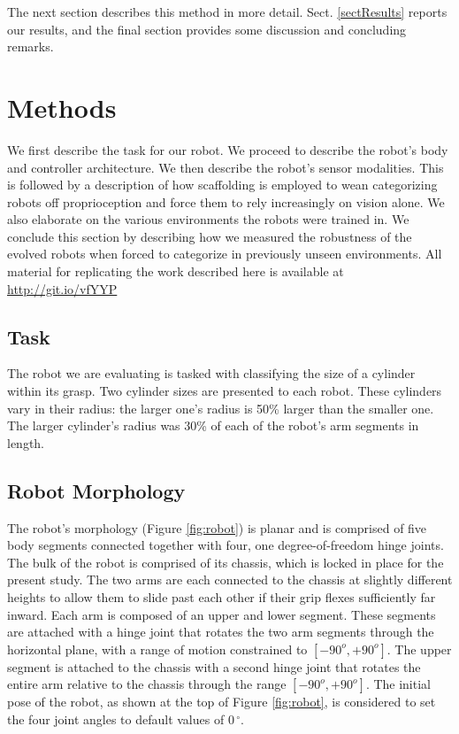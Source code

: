 \documentclass{sig-alternate}
\begin{document}
The next section describes this method in more detail. Sect. \ref{sectResults}
reports our results, and the final section provides some discussion
and concluding remarks.

\section {Methods}
\label{sectMethods}

We first describe the task for our robot. We proceed to describe the robot's body and
controller architecture. We then describe the robot's sensor modalities. This is
followed by a description of how scaffolding is employed to wean categorizing robots
off proprioception and force them to rely increasingly on vision alone. We also elaborate on the various environments the robots were trained in. We conclude
this section by describing how we measured the robustness of the evolved robots when
forced to categorize in previously unseen environments.
All material for replicating the work described here is available at
\href{http://git.io/vfYYP}{http://git.io/vfYYP}

\subsection {Task}

The robot we are evaluating is tasked with classifying the size of a cylinder within its grasp. Two cylinder sizes are presented to each robot. These cylinders vary in their radius: the larger one's radius is 50\% larger than the smaller one. The larger cylinder's radius was 30\% of each of the robot's arm segments in length. 

\subsection {Robot Morphology}

The robot's morphology (Figure \ref{fig:robot}) is planar and is comprised of five body segments connected together with four, one degree-of-freedom hinge joints. The bulk of the robot is comprised of its chassis, which is locked in place for the present study. The two arms are each connected to the chassis at slightly different heights to allow them to slide past each other if their grip flexes sufficiently far inward. Each arm is composed of an upper and lower segment. These segments are attached with a hinge joint that rotates the two arm segments through the horizontal plane, with a range of motion constrained to $[-90^o, +90^o]$. The upper segment is attached to the chassis with a second hinge joint that rotates the entire arm relative to the chassis through the range $[-90^o, +90^o]$.
The initial pose of the robot, as shown at the top of Figure \ref{fig:robot}, is considered to set the four joint angles to default values of $0\,^{\circ}$.
\end{document}
